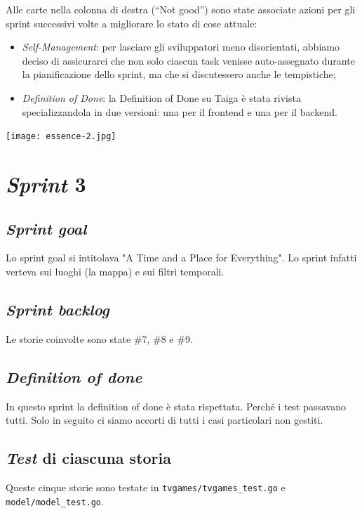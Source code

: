 \documentclass{article}
\begin{document}
Alle carte nella colonna di destra (``Not good'') sono state associate azioni
per gli sprint successivi volte a migliorare lo stato di cose attuale:
\begin{itemize}
	\item \emph{Self-Management}: per lasciare gli sviluppatori meno disorientati,
	      abbiamo deciso di assicurarci che non solo ciascun task venisse
	      auto-assegnato durante la pianificazione dello sprint, ma che si
	      discutessero anche le tempistiche;
	\item \emph{Definition of Done}: la Definition of Done su Taiga è stata
	      rivista specializzandola in due versioni: una per il frontend e una per
	      il backend.
\end{itemize}

\texttt{[image: essence-2.jpg]}

\section{\emph{Sprint} 3}

\subsection{\emph{Sprint goal}}

Lo sprint goal si intitolava "A Time and a Place for Everything". Lo sprint
infatti verteva sui luoghi (la mappa) e sui filtri temporali.

\subsection{\emph{Sprint backlog}}

Le storie coinvolte sono state \#7, \#8 e \#9.

\subsection{\emph{Definition of done}}

In questo sprint la definition of done è stata rispettata. Perché i test
passavano tutti. Solo in seguito ci siamo accorti di tutti i casi particolari
non gestiti.

\subsection{\emph{Test} di ciascuna storia}

Queste cinque storie sono testate in \verb!tvgames/tvgames_test.go! e
\verb!model/model_test.go!.
\end{document}
